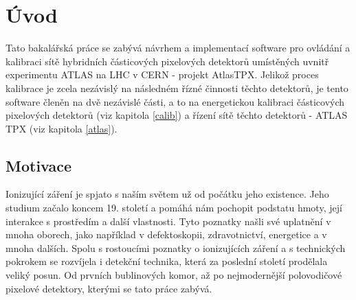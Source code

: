 

\chapter{Úvod}\label{chap01}
Tato bakalářská práce se zabývá návrhem a implementací software pro ovládání a kalibraci sítě hybridních částicových pixelových detektorů umístěných uvnitř experimentu ATLAS na LHC v CERN - projekt AtlasTPX. 
Jelikož proces kalibrace je zcela nezávislý na následném řízné činnosti těchto detektorů, je tento software členěn na dvě nezávislé části, a to na energetickou kalibraci částicových pixelových detektorů (viz kapitola \ref{calib}) a řízení sítě těchto detektorů - ATLAS TPX (viz kapitola \ref{atlas}).

\todo

\section{Motivace}
Ionizující záření je spjato s naším světem už od počátku jeho existence. Jeho studium začalo koncem 19. století a pomáhá nám pochopit podstatu hmoty, její interakce s prostředím a další vlastnosti. Tyto poznatky našli své uplatnění v mnoha oborech, jako například v defektoskopii, zdravotnictví, energetice a v mnoha dalších. Spolu s rostoucími poznatky o ionizujících záření a s technických pokrokem se rozvíjela i detekční technika, která za poslední století prodělala veliký posun. Od prvních bublinových komor, až po nejmodernější polovodičové pixelové detektory, kterými se tato práce zabývá. 


	
